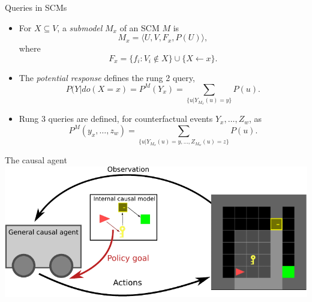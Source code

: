 \begin{frame}{Queries in SCMs}
    \begin{itemize}
        \item For $X \subseteq V$, a \emph{submodel} $M_x$ of an SCM $M$ is
        \begin{equation*}
            M_x = \langle U, V, F_x, P(U) \rangle,
        \end{equation*}
        where
        \begin{equation*}
            F_x = \{f_i : V_i \notin X \} \cup \{X \leftarrow x\}.
        \end{equation*}
        \item The \emph{potential response} defines the rung 2 query,
        \begin{equation*}
            P(Y | do(X = x) = P^{M}(Y_x) = \sum_{\{u | Y_{M_x}(u) = y\}}P(u).
        \end{equation*}
        \item Rung 3 queries are defined, for counterfactual events $Y_x, \dots, Z_w$, as
        \begin{equation*}
            P^M(y_x, \dots, z_w) = \sum_{\{u | Y_{M_x}(u) = y, \dots, Z_{M_w}(u) = z\}}P(u).
        \end{equation*}
    \end{itemize}
\end{frame}


\begin{frame}{The causal agent}
    \includegraphics[width=.9\linewidth]{causal_figures/conceptA}
\end{frame}

